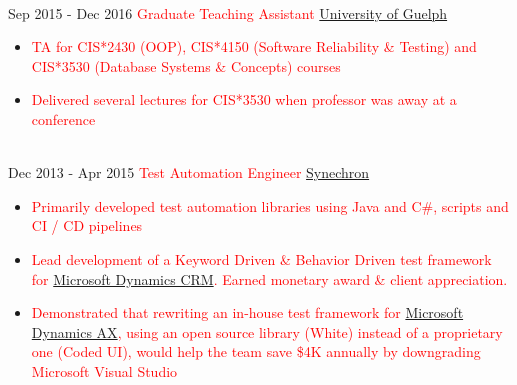 \documentclass[letterpaper]{twentysecondcv} %
\begin{document}
\begin{twenty}
{        }
    \\   
    \twentyitem
   		{Sep 2015 -}
		{Dec 2016}
        {\textcolor{red}{Graduate Teaching Assistant}}
        {\href{http://www.uoguelph.ca}{University of Guelph}}
        {}
        {
        {\begin{itemize}
        \item \textcolor{red}{TA for CIS*2430 (OOP), CIS*4150 (Software Reliability \& Testing) and CIS*3530 (Database Systems \& Concepts) courses}
        \item \textcolor{red}{Delivered several lectures for CIS*3530 when professor was away at a conference}
    \end{itemize}}
        }
     \\
     \twentyitem
   		{Dec 2013 -}
		{Apr 2015}
        {\textcolor{red}{Test Automation Engineer}}
        {\href{http://www.synechron.com/}{Synechron}}
        {}
        {
        \begin{itemize}
        \item \textcolor{red}{Primarily developed test automation libraries using Java and C\#, scripts and CI / CD pipelines}
        \item \textcolor{red}{Lead development of a Keyword Driven \& Behavior Driven test framework for \href{https://www.microsoft.com/en-ca/dynamics/crm.aspx}{Microsoft Dynamics CRM}. Earned monetary award \& client appreciation.}
        \item \textcolor{red}{Demonstrated that rewriting an in-house test framework for \href{https://www.microsoft.com/en-ca/dynamics/erp-ax-overview.aspx}{Microsoft Dynamics AX}, using an open source library (White) instead of a proprietary one (Coded UI), would help the team save \$4K annually by downgrading Microsoft Visual Studio}
    \end{itemize}
    	}
        
\end{twenty}

\end{document}
